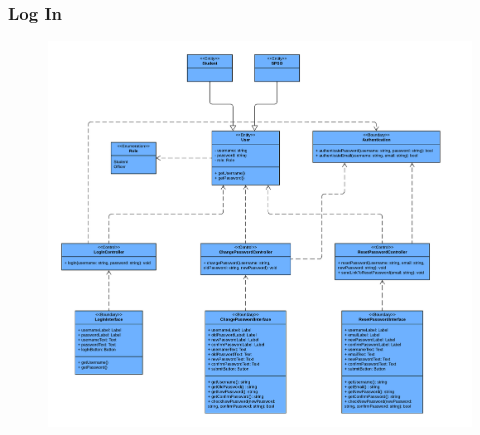    \newpage
    \subsubsection{Log In}
    \begin{center}
    \begin{figure}[!htp]
    \begin{center}
     \includegraphics[scale=.5]{images/Task2/ClassDiagrams/LogIn.pdf}
    \end{center}
    \label{refhinh1}
    \end{figure}
    \end{center}

    \newpage